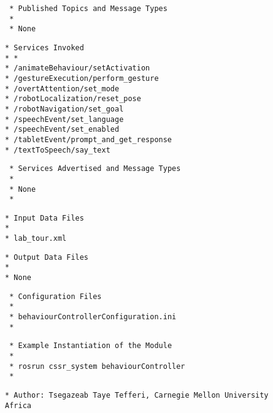 \documentclass{CSSRforAfrica}
\newcommand{\checkboxChecked}{\fbox{\ding{51}}} %
\newcommand{\checkboxCrossed}{\fbox{\ding{55}}} %
\begin{document}
\begin{description}
\item[\checkboxChecked] 
 {\small 
\begin{verbatim}                    
 * Published Topics and Message Types
 *
 * None
\end{verbatim}}

\item[\checkboxCrossed] 
 {\small 
\begin{verbatim}                    
* Services Invoked
* *
* /animateBehaviour/setActivation
* /gestureExecution/perform_gesture
* /overtAttention/set_mode
* /robotLocalization/reset_pose
* /robotNavigation/set_goal
* /speechEvent/set_language
* /speechEvent/set_enabled
* /tabletEvent/prompt_and_get_response
* /textToSpeech/say_text    
\end{verbatim}}

\item[\checkboxCrossed] 
 {\small 
\begin{verbatim}                    
 * Services Advertised and Message Types
 *
 * None
 * 
\end{verbatim}}

\item[\checkboxChecked] 
 {\small 
\begin{verbatim}
* Input Data Files
*
* lab_tour.xml
\end{verbatim}}

\item[\checkboxChecked] 
 {\small 
\begin{verbatim}
* Output Data Files
* 
* None
\end{verbatim}}

\item[\checkboxChecked] 
 {\small 
\begin{verbatim}
 * Configuration Files
 *
 * behaviourControllerConfiguration.ini
 *
\end{verbatim}}

\item[\checkboxChecked] 
 {\small 
\begin{verbatim}
 * Example Instantiation of the Module
 *
 * rosrun cssr_system behaviourController
 *
\end{verbatim}}

\item[\checkboxChecked] 
 {\small 
\begin{verbatim}
* Author: Tsegazeab Taye Tefferi, Carnegie Mellon University Africa
\end{verbatim}}


\end{description}
\end{document}
